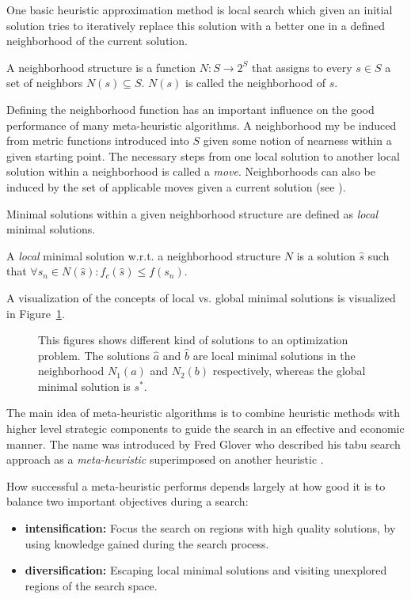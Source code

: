 One basic heuristic approximation method is local search which given an initial solution tries to iteratively replace this solution with a better one in a defined neighborhood of the current solution. 
\begin{definition}\label{def:neighborhood}
A neighborhood structure is a function $N:S\rightarrow 2^S$ that assigns to every $s \in S$ a set of neighbors $N(s) \subseteq S$. $N(s)$ is called the neighborhood of $s$.
\end{definition}
Defining the neighborhood function has an important influence on the good performance of many meta-heuristic algorithms. 
A neighborhood my be induced from metric functions introduced into $S$ given some notion of nearness within a given starting point. 
The necessary steps from one local solution to another local solution within a neighborhood is called a \emph{move}. Neighborhoods can also be induced by the set of applicable moves given a current solution (see \cite{gendreau2003tabusearch}).

Minimal solutions within a given neighborhood structure are defined as \emph{local} minimal solutions.
\begin{definition}
 A \emph{local} minimal solution w.r.t. a neighborhood structure $N$ is a solution $\hat{s}$  such that $\forall s_n \in N(\hat{s}):f_c(\hat{s})\leq f(s_n)$. 
\end{definition}
A visualization of the concepts of local vs. global minimal solutions is visualized in Figure~\ref{fig:fig_local_global}.
\begin{figure}[thpb]
   \footnotesize
   \centering
   \def\svgwidth{0.75\textwidth}
        
   \caption[]{This figures shows different kind of solutions to an optimization problem. The solutions $\hat{a}$ and $\hat{b}$ are local minimal solutions in the neighborhood $N_1(a)$ and $N_2(b)$ respectively, whereas the global minimal solution is $s^*$.}
   \label{fig:fig_local_global}
\end{figure}

The main idea of meta-heuristic algorithms is to combine heuristic methods with higher level strategic components to guide the search in an effective and economic manner. 
The name was introduced by Fred Glover who described his tabu search approach \grqq as a \emph{meta-heuristic} superimposed on another heuristic \grqq \cite{glover1988tabu}. 

How successful a meta-heuristic performs depends largely at how good it is to balance two important objectives during a search:
\begin{itemize}
\item{\bf{intensification:}} Focus the search on regions with high quality solutions, by using knowledge gained during the search process.
\item{\bf{diversification:}} Escaping local minimal solutions and visiting unexplored regions of the search space.
\end{itemize}

